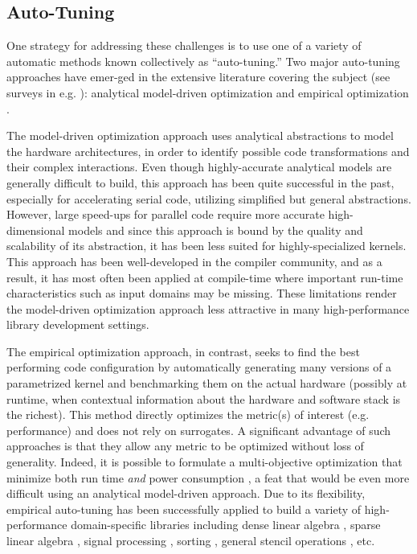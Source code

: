\documentclass{sig-alternate}
\begin{document}
\subsection{Auto-Tuning}


One strategy for addressing these challenges is to use one of a variety of
automatic methods known collectively as ``auto-tuning.'' Two major auto-tuning
approaches have emer-ged in the extensive literature covering the subject (see
surveys in e.g.
\citep{vuduc2001statistical, demmel2005self, vuduc2005oski, williams2008auto,
datta2008stencil, cavazos2008intelligent, li2009note, park2011evaluation}):
analytical model-driven optimization and empirical optimization
\citep{yotov2003comparison}.


The model-driven optimization approach uses analytical abstractions to model
the hardware architectures, in order to identify possible code transformations and their complex
interactions. Even though highly-accurate analytical models are generally
difficult to build, this approach has been quite successful in the past, especially for 
accelerating serial code, utilizing simplified but general abstractions. However,
large speed-ups for parallel code require more accurate high-dimensional models
and since this approach is bound by the quality and scalability of its
abstraction, it has been less suited for highly-specialized kernels. This
approach has been well-developed in the compiler community, and as a result, it has
most often been applied at compile-time where important run-time characteristics
such as input domains may be missing. These limitations render the model-driven
optimization approach less attractive in many high-performance library development settings.


The empirical optimization approach, in contrast, seeks to find the best
performing code configuration by automatically generating many versions of a
parametrized kernel and benchmarking them on the actual hardware (possibly at
runtime, when contextual information about the hardware and software stack is
the richest). This method directly optimizes the metric(s) of interest (e.g. performance) and does not rely on
surrogates.  A significant advantage of such approaches is that they allow any metric to be
optimized without loss of generality. Indeed, it is possible to formulate a multi-objective optimization that minimize both run time \emph{and}
power consumption \citep{rahman2011automated}, a feat that would be even more difficult using an
analytical model-driven approach. Due to its flexibility,
empirical auto-tuning has been successfully applied to build a variety of high-performance
domain-specific libraries including dense linear algebra
\citep{clint2001automated, bilmes1997optimizing}, sparse linear algebra
\citep{vuduc2005oski}, signal processing \citep{frigo2005design}, sorting
\citep{li2004dynamically}, general stencil operations \citep{kamil2010auto}, etc.
\end{document}
